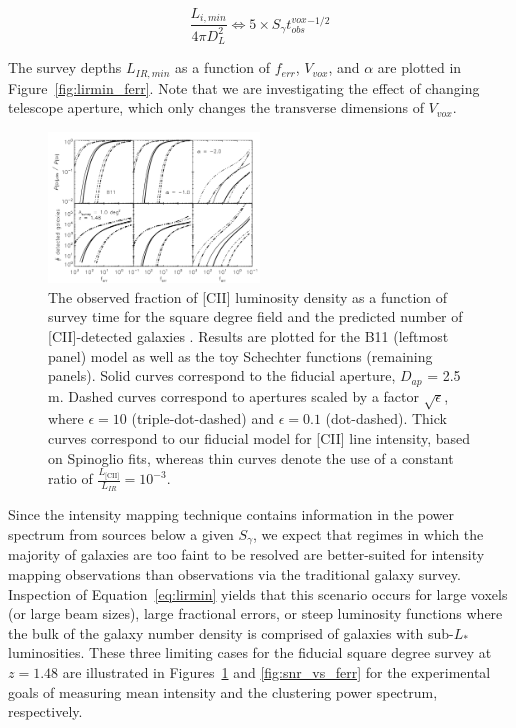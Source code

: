 \documentclass[iop]{emulateapj}
\begin{document}
\begin{equation}
\frac{L_{i,min}}{4\pi D_L^2} \Leftrightarrow 5 \times S_{\gamma} t_{obs}^{vox}^{-1/2}
\end{equation}

The survey depths $L_{IR,min}$ as a function of $f_{err}$, $V_{vox}$, and $\alpha$ are plotted in Figure~\ref{fig:lirmin_ferr}. Note that we are investigating the effect of changing telescope aperture, which only changes the transverse dimensions of $V_{vox}$.

\begin{figure}
\centering
\includegraphics[width=0.5\textwidth]{Ngal_fracCII_STARFIRE_1sqdeg_z1p5_ferr_0p1vpix_vpix_10vpix_alpham1p0_alpham2p0_b11}
\caption{The observed fraction of [CII] luminosity density as a function of survey time for the square degree field and the predicted number of [CII]-detected galaxies . Results are plotted for the B11 (leftmost panel) model as well as the toy Schechter functions (remaining panels). Solid curves correspond to the fiducial aperture, $D_{ap}$ = 2.5 m. Dashed curves correspond to apertures scaled by a factor $\sqrt{\epsilon}$, where $\epsilon=10$ (triple-dot-dashed) and $\epsilon=0.1$ (dot-dashed). Thick curves correspond to our fiducial model for [CII] line intensity, based on Spinoglio fits, whereas thin curves denote the use of a constant ratio of $\frac{L_{\textrm{[CII]}}}{L_{IR}} = 10^{-3}$.}
\label{fig:ngal_frac}
\end{figure}

Since the intensity mapping technique contains information in the power spectrum from sources below a given $S_{\gamma}$, we expect that regimes in which the majority of galaxies are too faint to be resolved are better-suited for intensity mapping observations than observations via the traditional galaxy survey. Inspection of Equation~\ref{eq:lirmin} yields that this scenario occurs for large voxels (or large beam sizes), large fractional errors, or steep luminosity functions where the bulk of the galaxy number density is comprised of galaxies with sub-$L_*$ luminosities. These three limiting cases for the fiducial square degree survey at $z=1.48$ are illustrated in Figures~\ref{fig:ngal_frac} and \ref{fig:snr_vs_ferr} for the experimental goals of measuring mean intensity and the clustering power spectrum, respectively.
\end{document}
